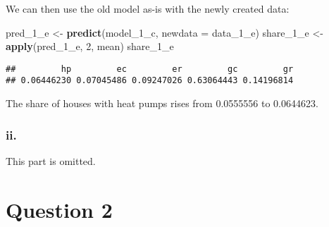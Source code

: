 \documentclass[
]{article}
\newenvironment{Shaded}{\begin{snugshade}}{\end{snugshade}}
\newcommand{\DataTypeTok}[1]{\textcolor[rgb]{0.13,0.29,0.53}{#1}}
\newcommand{\DecValTok}[1]{\textcolor[rgb]{0.00,0.00,0.81}{#1}}
\newcommand{\FloatTok}[1]{\textcolor[rgb]{0.00,0.00,0.81}{#1}}
\newcommand{\KeywordTok}[1]{\textcolor[rgb]{0.13,0.29,0.53}{\textbf{#1}}}
\newcommand{\NormalTok}[1]{#1}
\newcommand{\OperatorTok}[1]{\textcolor[rgb]{0.81,0.36,0.00}{\textbf{#1}}}
\newcommand{\StringTok}[1]{\textcolor[rgb]{0.31,0.60,0.02}{#1}}
\begin{document}
\begin{Shaded}
\end{Shaded}


We can then use the old model as-is with the newly created data:

\begin{Shaded}
\begin{Highlighting}[]
\NormalTok{pred_}\DecValTok{1}\NormalTok{_e <-}\StringTok{ }\KeywordTok{predict}\NormalTok{(model_}\DecValTok{1}\NormalTok{_c, }\DataTypeTok{newdata =}\NormalTok{ data_}\DecValTok{1}\NormalTok{_e)}
\NormalTok{share_}\DecValTok{1}\NormalTok{_e <-}\StringTok{ }\KeywordTok{apply}\NormalTok{(pred_}\DecValTok{1}\NormalTok{_e, }\DecValTok{2}\NormalTok{, mean)}
\NormalTok{share_}\DecValTok{1}\NormalTok{_e}
\end{Highlighting}
\end{Shaded}

\begin{verbatim}
##         hp         ec         er         gc         gr 
## 0.06446230 0.07045486 0.09247026 0.63064443 0.14196814
\end{verbatim}

The share of houses with heat pumps rises from 0.0555556 to 0.0644623.

\hypertarget{ii.-3}{%
\subsubsection{ii.}\label{ii.-3}}

This part is omitted.

\pagebreak

\hypertarget{question-2}{%
\section{Question 2}\label{question-2}}
\end{document}
